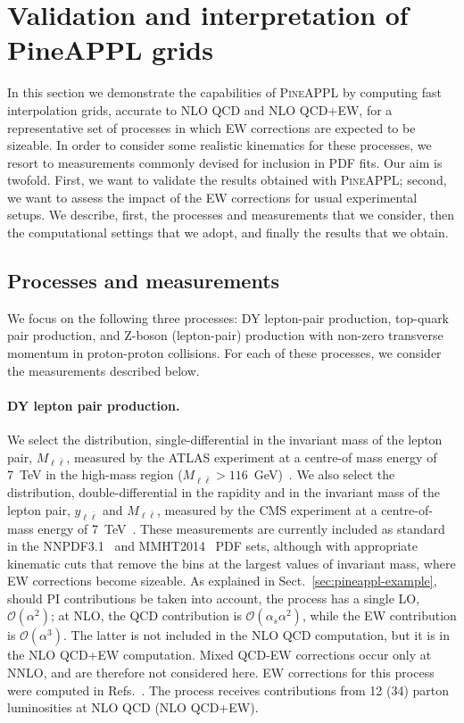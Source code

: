 \section{Validation and interpretation of PineAPPL grids}
\label{sec:results}

In this section we demonstrate the capabilities of \textsc{PineAPPL} by
computing fast interpolation grids, accurate to NLO QCD and NLO QCD+EW,
for a representative set of processes in which EW corrections are expected 
to be sizeable. In order to consider some realistic kinematics for these
processes, we resort to measurements commonly devised for inclusion in PDF
fits. Our aim is twofold. First, we want to validate the results
obtained with \textsc{PineAPPL}; second, we want to assess the
impact of the EW corrections for usual experimental setups. We describe, first,
the processes and measurements that we consider, then the computational
settings that we adopt, and finally the results that we obtain.

\subsection{Processes and measurements}
\label{subsec:processes_and_measurements}

We focus on the following three processes: DY lepton-pair production, top-quark
pair production, and Z-boson (lepton-pair) production with non-zero transverse
momentum in proton-proton collisions. For each of these processes, we consider the measurements
described below.

\paragraph{DY lepton pair production.}
We select the distribution, single-differential in the invariant mass of the
lepton pair, $M_{\ell \bar\ell}$, measured by the ATLAS experiment at a centre-of
mass energy of 7~TeV in the high-mass region
($M_{\ell\bar\ell}>116$~GeV)~\cite{Aad:2013iua}.
We also select the distribution, double-differential in the rapidity and in
the invariant mass of the lepton pair, $y_{\ell\bar\ell}$ and $M_{\ell\bar\ell}$,
measured by the CMS experiment at a centre-of-mass energy of
7~TeV~\cite{Chatrchyan:2013tia}.
These measurements are currently included as standard in the
NNPDF3.1~\cite{Ball:2017nwa} and MMHT2014~\cite{Harland-Lang:2014zoa} PDF sets,
although with appropriate kinematic cuts that remove the bins at the largest
values of invariant mass, where EW corrections become sizeable. As explained in
Sect.~\ref{sec:pineappl-example}, should PI contributions be taken into account,
the process has a single LO, $\mathcal{O}(\alpha^2)$; at NLO, the
QCD contribution is $\mathcal{O}(\alpha_s\alpha^2)$, while the EW contribution
is $\mathcal{O}(\alpha^3)$. The latter is not included in the NLO
QCD computation, but it is in the NLO QCD+EW computation. Mixed QCD-EW
corrections occur only at NNLO, and are therefore not considered here.
EW corrections for this process were computed in
Refs.~\cite{Baur:2001ze,Dittmaier:2009cr}. The process receives contributions
from 12 (34) parton luminosities at NLO QCD (NLO QCD+EW).

